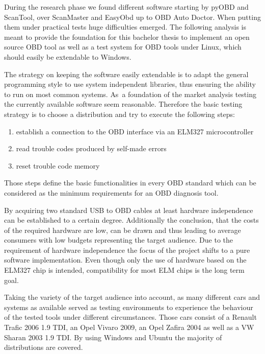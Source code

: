{During the research phase we found different software starting by pyOBD
and ScanTool, over ScanMaster and EasyObd up to OBD Auto Doctor. When
putting them under practical tests huge difficulties emerged. The
following analysis is meant to provide the foundation for this bachelor
thesis to implement an open source OBD tool as well as a test system for
OBD tools under Linux, which should easily be }{extendable }{to
Windows.}

{}

{The strategy on keeping the software easily extendable is to adapt the
general programming style to use system independent libraries, thus
ensuring the ability to run on most common systems. }{As}{~a foundation
}{of the market analysis }{testing the currently available software seem
reasonable. Therefore the }{basic testing strategy is to choose a
distribution and try to execute the following steps:}

{}

\begin{enumerate}
\tightlist
\item
  {establish a connection to the OBD interface via an ELM327
  microcontroller }
\item
  {read trouble codes produced by self-made errors}
\item
  {reset trouble code memory}
\end{enumerate}

{}

{Those steps define the basic functionalities in every OBD standard
which can be considered as the minimum requirements for an OBD diagnosis
tool.}

{By acquiring two standard USB to OBD cables at least hardware
independence can be established to a certain degree. Additionally the
conclusion, that the costs of the required hardware are low, can be
drawn and thus leading to average consumers with low budgets
representing the target audience. Due to the requirement of hardware
independence the focus of the project shifts to a pure software
implementation. Even though only the use of hardware based on the ELM327
chip is intended, compatibility for most ELM chips is the long term
goal. }

{Taking the variety of the target audience into account, as many
different cars and systems }{as available }{served as testing
environments to experience the behaviour of the tested tools under
different circumstances. Those cars consist of a Renault Trafic 2006 1.9
TDI, an Opel Vivaro 2009, an Opel Zafira 2004 as well as a VW Sharan
2003 1.9 TDI. By using Windows and Ubuntu the majority of
}{distributions }{are covered.}

